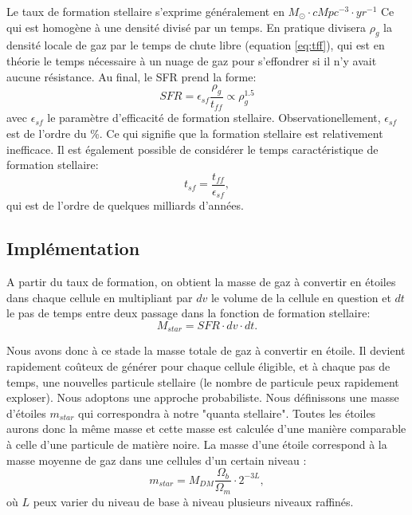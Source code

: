 Le taux de formation stellaire s'exprime généralement en $M_\odot \cdot cMpc^{-3} \cdot yr^{-1}$  
Ce qui est homogène à une densité divisé par un temps.
En pratique divisera $\rho_g$ la densité locale de gaz par le temps de chute libre (equation \ref{eq:tff}), qui est en théorie le temps nécessaire à un nuage de gaz pour s'effondrer si il n'y avait aucune résistance.
Au final, le \ac{SFR} prend la forme:
\begin{equation}
	SFR = \epsilon_{sf} \frac{\rho_g}{t_{ff}} \propto \rho_g^{1.5}
    \label{eq_sfr}
\end{equation}
avec  $\epsilon_{sf}$ le paramètre d'efficacité de formation stellaire.
Observationellement, $\epsilon_{sf}$  est de l'ordre du \%. %
Ce qui signifie que la formation stellaire est relativement inefficace.
Il est également possible de considérer le temps caractéristique de formation stellaire:
\begin{equation}
t_{sf} =  \frac{t_{ff}}{ \epsilon_{sf} },
\end{equation}
qui est de l'ordre de quelques milliards d'années.



\subsection{Implémentation}

A partir du taux de formation, on obtient la masse de gaz à convertir en étoiles dans chaque cellule en multipliant par $dv$ le volume de la cellule en question et $dt$ le pas de temps entre deux passage dans la fonction de formation stellaire:
\begin{equation}
	M_{star} = SFR \cdot dv \cdot dt .
\end{equation}

Nous avons donc à ce stade la masse totale de gaz à convertir en étoile.
Il devient rapidement coûteux de générer pour chaque cellule éligible, et à chaque pas de temps, une nouvelles particule stellaire (le nombre de particule peux rapidement exploser).
Nous adoptons une approche probabiliste.
Nous définissons une masse d'étoiles $m_{star}$ qui correspondra à notre "quanta stellaire".
Toutes les étoiles aurons donc la même masse et cette masse est calculée d'une manière comparable à celle d'une particule de matière noire.
La masse d'une étoile correspond à la masse moyenne de gaz dans une cellules d'un certain niveau :
\begin{equation}
 m_{star} = M_{DM} \frac{\Omega_b}{\Omega_m}\cdot 2^{-3L},
\end{equation}
où $L$ peux varier du niveau de base à niveau plusieurs niveaux raffinés.

